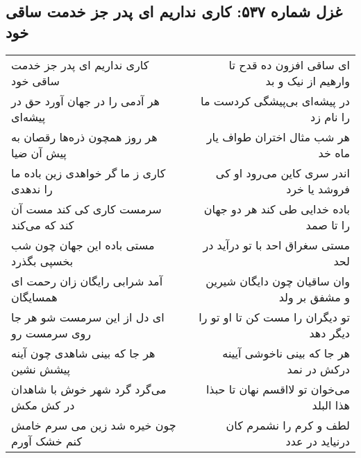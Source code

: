 \begin{center}
\section*{غزل شماره ۵۳۷: کاری نداریم ای پدر جز خدمت ساقی خود}
\label{sec:0537}
\begin{longtable}{l p{0.5cm} r}
کاری نداریم ای پدر جز خدمت ساقی خود
&&
ای ساقی افزون ده قدح تا وارهیم از نیک و بد
\\
هر آدمی را در جهان آورد حق در پیشه‌ای
&&
در پیشه‌ای بی‌پیشگی کردست ما را نام زد
\\
هر روز همچون ذره‌ها رقصان به پیش آن ضیا
&&
هر شب مثال اختران طواف یار ماه خد
\\
کاری ز ما گر خواهدی زین باده ما را ندهدی
&&
اندر سری کاین می‌رود او کی فروشد یا خرد
\\
سرمست کاری کی کند مست آن کند که می‌کند
&&
باده خدایی طی کند هر دو جهان را تا صمد
\\
مستی باده این جهان چون شب بخسپی بگذرد
&&
مستی سغراق احد با تو درآید در لحد
\\
آمد شرابی رایگان زان رحمت ای همسایگان
&&
وان ساقیان چون دایگان شیرین و مشفق بر ولد
\\
ای دل از این سرمست شو هر جا روی سرمست رو
&&
تو دیگران را مست کن تا او تو را دیگر دهد
\\
هر جا که بینی شاهدی چون آینه پیشش نشین
&&
هر جا که بینی ناخوشی آیینه درکش در نمد
\\
می‌گرد گرد شهر خوش با شاهدان در کش مکش
&&
می‌خوان تو لااقسم نهان تا حبذا هذا البلد
\\
چون خیره شد زین می سرم خامش کنم خشک آورم
&&
لطف و کرم را نشمرم کان درنیاید در عدد
\\
\end{longtable}
\end{center}

